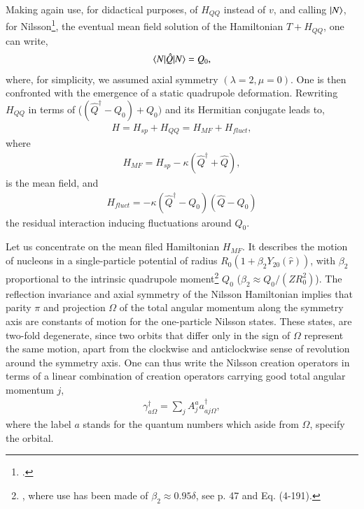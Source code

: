 Making again use, for didactical purposes, of $H_{QQ}$ instead of $v$, and calling $|{N} \rangle$, for Nilsson\footnote{\cite{Nilsson:55}.}, the eventual mean field solution of the Hamiltonian $T+H_{QQ}$, one can write,
  \begin{align}\label{eq0.4.1}
\langle {N|\hat Q|N} \rangle=Q_0,
  \end{align}
where, for simplicity, we assumed axial symmetry $(\lambda=2,\mu=0)$. One is then confronted with the  emergence of a static quadrupole deformation.
Rewriting $H_{QQ}$ in terms of ($(\hat Q^\dagger-Q_0)+Q_0)$ and its Hermitian conjugate leads to,  
  \begin{align}\label{eq0.4.2}
H=H_{sp}+H_{QQ}=H_{MF}+H_{fluct},
\end{align}
where 
  \begin{align}\label{eq0.4.3}
H_{MF}=H_{sp}-\kappa(\hat Q^\dagger+\hat Q),
\end{align}
is the mean field, and
\begin{align}\label{eq0.4.4}
H_{fluct}=-\kappa(\hat Q^\dagger-Q_0)(\hat Q-Q_0)
\end{align}
the residual interaction inducing fluctuations around $Q_0$.


 Let us  concentrate on the mean filed Hamiltonian $H_{MF}$. It describes the motion of nucleons in a single-particle potential of radius $R_0(1+\beta_2Y_{20}(\hat r))$, with $\beta_2$ proportional to the intrinsic quadrupole moment\footnote{\cite{Mottelson:59}, where use has been made of $\beta_2\approx0.95\delta$, see \cite{Bohr:75} p. 47 and Eq. (4-191).} $Q_0$ ($\beta_2\approx Q_0/(ZR_0^2)$). The reflection invariance and axial symmetry of the Nilsson Hamiltonian implies that parity $\pi$ and projection $\Omega$ of the total angular momentum along the symmetry axis are constants of motion for the one-particle Nilsson states. These states, are two-fold degenerate, since two orbits that differ only in the sign of $\Omega$ represent the same motion, apart from the clockwise and anticlockwise sense of revolution around the symmetry axis. One can thus write the Nilsson creation operators in terms of a linear combination of creation operators carrying good total angular momentum $j$, 
\begin{align}\label{eq0.4.5}
\gamma^\dagger_{a\Omega}=\sum_jA_j^aa^\dagger_{aj\Omega},
\end{align}
where the label $a$ stands for  the quantum numbers which aside from $\Omega$, specify the orbital. 

